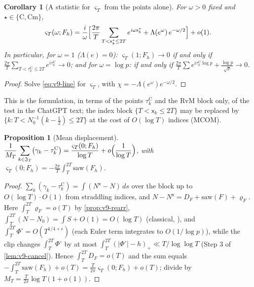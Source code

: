 \documentclass[11pt,a4paper]{article}
\numberwithin{equation}{section}
\newtheorem{proposition}[theorem]{Proposition}
\newtheorem{corollary}[theorem]{Corollary}
\theoremstyle{definition}
\theoremstyle{remark}
\newcommand{\Cm}{\mathrm{Cm}}
\begin{document}
\begin{corollary}[A statistic for $\varsigma_T$ from the points alone]\label{cor:v9-test}
For $\omega>0$ fixed and $\star\in\{\mathrm C,\Cm\}$,
\begin{equation}\label{eq:v9-test}
\varsigma_T(\omega;F_h)=\frac{i}{\omega}\Bigl[\frac{2\pi}{T}\sum_{T<\mathsf x_k^\star\le2T}e^{i\omega\mathsf x_k^\star}+\Lambda(e^{\omega})\,e^{-\omega/2}\Bigr]+o(1).
\end{equation}
In particular, for $\omega=1$ ($\Lambda(e)=0$): $\varsigma_T(1;F_h)\to0$ if and only if $\frac{2\pi}T\sum_{T<\tau_k^{\mathrm C}\le2T}e^{i\tau_k^{\mathrm C}}\to0$; and for $\omega=\log p$: if and only if $\frac{2\pi}T\sum e^{i\tau_k^{\mathrm C}\log p}+\frac{\log p}{\sqrt p}\to0$.
\end{corollary}
\begin{proof}
Solve \eqref{eq:v9-line} for $\varsigma_T$, with $\chi=-\Lambda(e^\omega)e^{-\omega/2}$.
\end{proof}
This is the formulation, in terms of the points $\tau_k^{\mathrm C}$ and the RvM block only, of the test in the ChatGPT text; the index block $\{T<\mathsf x_k\le2T\}$ may be replaced by $\{k:T<N_0^{-1}(k-\tfrac12)\le2T\}$ at the cost of $O(\log T)$ indices (MCOM).

\begin{proposition}[Mean displacement]\label{prop:v9-mean}
$\displaystyle\frac1{M_T}\sum_{k\in\mathfrak J_T}\bigl(\gamma_k-\tau_k^{\mathrm C}\bigr)=\frac{\varsigma_T(0;F_h)}{\log T}+o\Bigl(\frac1{\log T}\Bigr)$, with $\varsigma_T(0;F_h)=-\frac{2\pi}T\int_T^{2T}\mathrm{saw}(F_h)$.
\end{proposition}
\begin{proof}
$\sum_k(\gamma_k-\tau_k^{\mathrm C})=\int(N^{\mathsf x}-N)\,ds$ over the block up to $O(\log T)\cdot O(1)$ from straddling indices, and $N-N^{\mathsf x}=D_F+\mathrm{saw}(F)+\varrho_F$. Here $\int_T^{2T}\varrho_F=o(T)$ by \cref{prop:v9-rearr}, $\int_T^{2T}(N-N_0)=\int S+O(1)=O(\log T)$ (classical, \cite{Titchmarsh}), and $\int_T^{2T}\Phi^\circ=O(T^{1/4+\epsilon})$ (each Euler term integrates to $O(1/\log p)$), while the clip changes $\int_T^{2T}\Phi^\circ$ by at most $\int_T^{2T}(|\Phi^\circ|-h)_+\ll T/\log\log T$ (Step 3 of \cref{lem:v9-cancel}). Hence $\int_T^{2T}D_F=o(T)$ and the sum equals $-\int_T^{2T}\mathrm{saw}(F_h)+o(T)=\frac{T}{2\pi}\varsigma_T(0;F_h)+o(T)$; divide by $M_T=\frac T{2\pi}\log T(1+o(1))$.
\end{proof}
\end{document}
